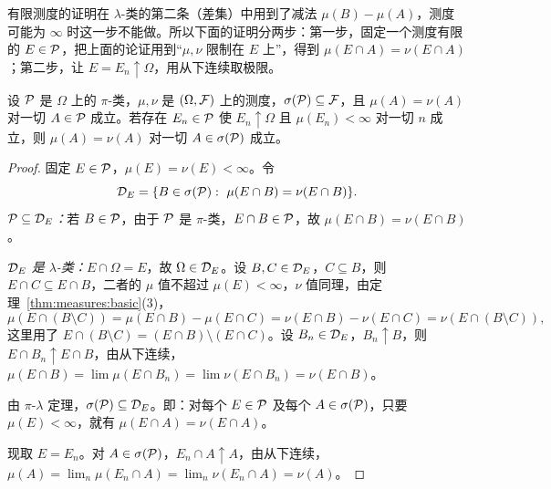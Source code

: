 \begin{remark}[证明思路]
有限测度的证明在 $\lambda$-类的第二条（差集）中用到了减法 $\mu(B)-\mu(A)$，测度可能为 $\infty$ 时这一步不能做。所以下面的证明分两步：第一步，固定一个测度有限的 $E\in\mathcal{P}$，把上面的论证用到“$\mu,\nu$ 限制在 $E$ 上”，得到 $\mu(E\cap A)=\nu(E\cap A)$；第二步，让 $E=E_n\uparrow\Omega$，用从下连续取极限。
\end{remark}

\begin{theorem}\label{thm:measures:uniqueness}
设 $\mathcal{P}$ 是 $\Omega$ 上的 $\pi$-类，$\mu,\nu$ 是 $(\Omega,\mathcal{F})$ 上的测度，$\sigma(\mathcal{P})\subseteq\mathcal{F}$，且 $\mu(A)=\nu(A)$ 对一切 $A\in\mathcal{P}$ 成立。若存在 $E_n\in\mathcal{P}$ 使 $E_n\uparrow\Omega$ 且 $\mu(E_n)<\infty$ 对一切 $n$ 成立，则 $\mu(A)=\nu(A)$ 对一切 $A\in\sigma(\mathcal{P})$ 成立。
\end{theorem}
\begin{proof}
固定 $E\in\mathcal{P}$，$\mu(E)=\nu(E)<\infty$。令
\[
\mathcal{D}_E=\{B\in\sigma(\mathcal{P}):\ \mu(E\cap B)=\nu(E\cap B)\}.
\]
\emph{$\mathcal{P}\subseteq\mathcal{D}_E$：}若 $B\in\mathcal{P}$，由于 $\mathcal{P}$ 是 $\pi$-类，$E\cap B\in\mathcal{P}$，故 $\mu(E\cap B)=\nu(E\cap B)$。

\emph{$\mathcal{D}_E$ 是 $\lambda$-类：}$E\cap\Omega=E$，故 $\Omega\in\mathcal{D}_E$。设 $B,C\in\mathcal{D}_E$，$C\subseteq B$，则 $E\cap C\subseteq E\cap B$，二者的 $\mu$ 值不超过 $\mu(E)<\infty$，$\nu$ 值同理，由定理~\ref{thm:measures:basic}(3)，
\[
\mu(E\cap(B\setminus C))=\mu(E\cap B)-\mu(E\cap C)=\nu(E\cap B)-\nu(E\cap C)=\nu(E\cap(B\setminus C)),
\]
这里用了 $E\cap(B\setminus C)=(E\cap B)\setminus(E\cap C)$。设 $B_n\in\mathcal{D}_E$，$B_n\uparrow B$，则 $E\cap B_n\uparrow E\cap B$，由从下连续，$\mu(E\cap B)=\lim\mu(E\cap B_n)=\lim\nu(E\cap B_n)=\nu(E\cap B)$。

由 $\pi$-$\lambda$ 定理，$\sigma(\mathcal{P})\subseteq\mathcal{D}_E$。即：对每个 $E\in\mathcal{P}$ 及每个 $A\in\sigma(\mathcal{P})$，只要 $\mu(E)<\infty$，就有 $\mu(E\cap A)=\nu(E\cap A)$。

现取 $E=E_n$。对 $A\in\sigma(\mathcal{P})$，$E_n\cap A\uparrow A$，由从下连续，$\mu(A)=\lim_n\mu(E_n\cap A)=\lim_n\nu(E_n\cap A)=\nu(A)$。
\end{proof}

